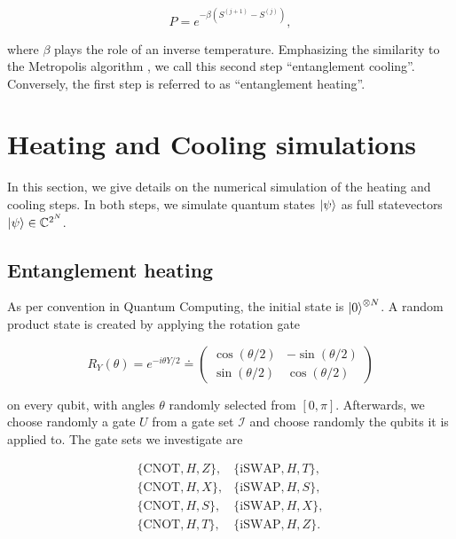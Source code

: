 \documentclass[reprint,amsmath,amssymb,aps,prb,nofootinbib]{revtex4-2}
\begin{document}
    \begin{equation}
        P = e^{-\beta(S^{(j+1)}-S^{(j)})},
        \label{theory:eq:metropolis_update}
    \end{equation}

    where $\beta$ plays the role of an inverse temperature. Emphasizing the similarity to the Metropolis algorithm
    \cite{Metropolis:1953:EquationsOfState}, we call this second step ``entanglement cooling''. Conversely,
    the first step is referred to as ``entanglement heating''.

    \section{Heating and Cooling simulations}
    \label{sec:simulation}

    In this section, we give details on the numerical simulation of the heating and cooling steps.
    In both steps, we simulate quantum states $\ket{\psi}$ as full statevectors $\ket{\psi}\in\mathbb{C}^{2^N}$.

    \vspace{\baselineskip}

    \subsection{Entanglement heating}
    \label{sec:simulation:heating}

    As per convention in Quantum Computing, the initial state is $\ket{0}^{\otimes N}$.
    A random product state is created by applying the rotation gate

    \begin{equation}
        R_Y(\theta) = e^{-i\theta Y/2} \doteq \left(\begin{array}{cc}
            \cos(\theta/2) & -\sin(\theta/2) \\ \sin(\theta/2) & \cos(\theta/2)
        \end{array}\right)
    \end{equation}

    on every qubit, with angles $\theta$ randomly selected from $[0,\pi]$. Afterwards, we choose randomly a gate
    $U$ from a gate set $\mathcal{I}$ and choose randomly the qubits it is applied to. The gate sets we investigate
    are

    \begin{equation}
        \begin{array}{cc}
            \{\text{CNOT},H,Z\}, & \{\text{iSWAP},H,T\}, \\
            \{\text{CNOT},H,X\}, & \{\text{iSWAP},H,S\}, \\
            \{\text{CNOT},H,S\}, & \{\text{iSWAP},H,X\}, \\
            \{\text{CNOT},H,T\}, & \{\text{iSWAP},H,Z\}.
        \end{array}
    \end{equation}
\end{document}
